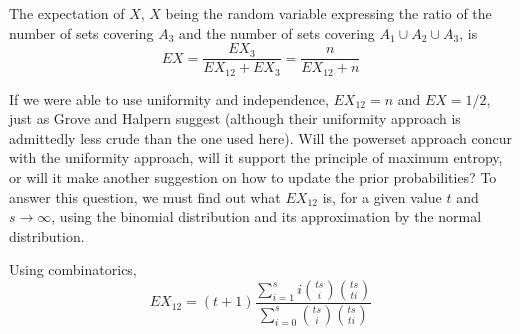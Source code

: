 \documentclass[phd,12pt,oneside]{ubcthesis}
\begin{document}
{\noindent}The expectation of $X$, $X$ being the random variable
expressing the ratio of the number of sets covering $A_{3}$ and the
number of sets covering $A_{1}\cup{}A_{2}\cup{}A_{3}$, is
\begin{equation}
  \label{eq:jahbohgh}
  EX=\frac{EX_{3}}{EX_{12}+EX_{3}}=\frac{n}{EX_{12}+n}
\end{equation}

If we were able to use uniformity and independence, $EX_{12}=n$ and
$EX=1/2$, just as Grove and Halpern suggest (although their uniformity
approach is admittedly less crude than the one used here). Will the
powerset approach concur with the uniformity approach, will it support
the principle of maximum entropy, or will it make another suggestion
on how to update the prior probabilities? To answer this question, we
must find out what $EX_{12}$ is, for a given value $t$ and
$s\rightarrow\infty$, using the binomial distribution and its
approximation by the normal distribution.

Using combinatorics,
\begin{equation}
  \label{eq:idooyeib}
  EX_{12}=(t+1)\frac{\sum_{i=1}^{s}i\binom{ts}{i}\binom{ts}{ti}}{\sum_{i=0}^{s}\binom{ts}{i}\binom{ts}{ti}}
\end{equation}
\end{document}
